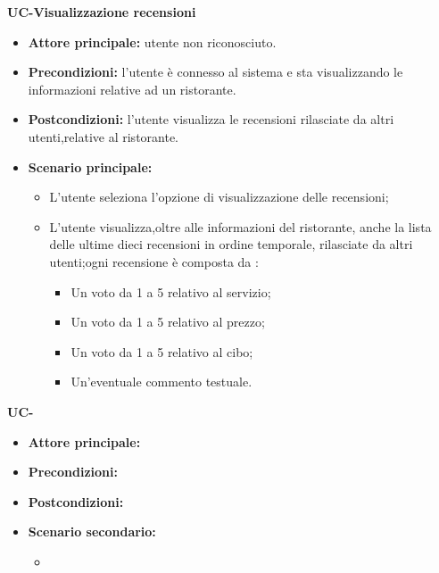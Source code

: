 \textbf{UC-Visualizzazione recensioni}
\begin{itemize}
\item \textbf{Attore principale:} utente non riconosciuto.
\item \textbf{Precondizioni:} l'utente è connesso al sistema e sta visualizzando
le informazioni relative ad un ristorante.
\item \textbf{Postcondizioni:} l'utente visualizza le recensioni rilasciate da altri utenti,relative al
ristorante.
\item \textbf{Scenario principale:}
\begin{itemize}
    \item L'utente seleziona l'opzione di visualizzazione delle recensioni;
    \item L'utente visualizza,oltre alle informazioni del ristorante, anche la lista delle ultime dieci recensioni 
    in ordine temporale, rilasciate da altri utenti;ogni recensione è composta da :
    \begin{itemize}
        \item Un voto da 1 a 5 relativo al servizio;
        \item Un voto da 1 a 5 relativo al prezzo;
        \item Un voto da 1 a 5 relativo al cibo;
        \item Un'eventuale commento testuale.
    \end{itemize}
\end{itemize}
\end{itemize}

\textbf{UC-}
\begin{itemize}
\item \textbf{Attore principale:}
\item \textbf{Precondizioni:} 
\item \textbf{Postcondizioni:} 
\item \textbf{Scenario secondario:}
\begin{itemize}
    \item 
\end{itemize}
\end{itemize}

